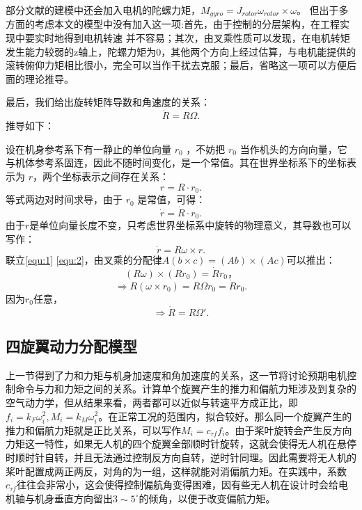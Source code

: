 部分文献的建模中还会加入电机的陀螺力矩\cite{quanbook}，$M_{gyro}=J_{rotor} \omega_{rotor} \times \omega$。 但出于多方面的考虑本文的模型中没有加入这一项:首先，由于控制的分层架构，在工程实现中要实时地得到电机转速  并不容易；其次，由叉乘性质可以发现，在电机转矩发生能力较弱的z轴上，陀螺力矩为$0$，其他两个方向上经过估算，与电机能提供的滚转俯仰力矩相比很小，完全可以当作干扰去克服；最后，省略这一项可以方便后面的理论推导。

最后，我们给出旋转矩阵导数和角速度的关系：
  \begin{equation}
    \dot R=R\Omega.
    \label{equ:dotR}
  \end{equation}
推导如下：

设在机身参考系下有一静止的单位向量 $r_0$ ，不妨把 $r_0$ 当作机头的方向向量，它与机体参考系固连，因此不随时间变化，是一个常值。其在世界坐标系下的坐标表示为 $r$，两个坐标表示之间存在关系：
  $$r=R \cdot r_0.$$
等式两边对时间求导，由于 $r_0$ 是常值，可得：
  \begin{equation}
    \dot r= \dot R \cdot r_0.
    \label{equ:1}
  \end{equation}
由于$r$是单位向量长度不变，只考虑世界坐标系中旋转的物理意义，其导数也可以写作：
  \begin{equation}
    \dot r=R \omega \times r.
    \label{equ:2}
  \end{equation}
联立\ref{equ:1}  \ref{equ:2}，由叉乘的分配律$A(b\times c)=(Ab)\times (Ac)$可以推出：
$$(R\omega)\times(Rr_0)=\dot R r_0，$$
$$\Rightarrow R(\omega \times r_0)=R\Omega r_0=\dot R r_0.$$
因为$r_0$任意，
$$\Rightarrow \dot R=R \Omega'.$$

\subsection*{四旋翼动力分配模型}
上一节得到了力和力矩与机身加速度和角加速度的关系，这一节将讨论预期电机控制命令与力和力矩之间的关系。计算单个旋翼产生的推力和偏航力矩涉及到复杂的空气动力学，但从结果来看，两者都可以近似与转速平方成正比\cite{minimumsnap}，即$f_i=k_F \omega_i^2,M_i=k_M \omega_i^2$。在正常工况的范围内，拟合较好。那么同一个旋翼产生的推力和偏航力矩就是正比关系，可以写作$M_i=c_{\tau f}f_i$。由于桨叶旋转会产生反方向力矩这一特性，如果无人机的四个旋翼全部顺时针旋转，这就会使得无人机在悬停时顺时针自转，并且无法通过控制反方向自转，逆时针同理。因此需要将无人机的桨叶配置成两正两反，对角的为一组，这样就能对消偏航力矩。在实践中，系数$c_{\tau f}$往往会非常小，这会使得控制偏航角变得困难，因有些无人机在设计时会给电机轴与机身垂直方向留出$3\sim5^\circ$的倾角，以便于改变偏航力矩。

